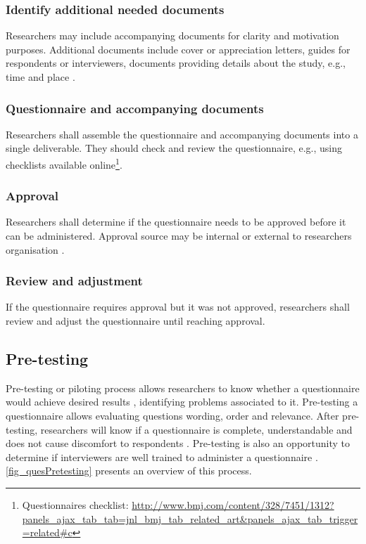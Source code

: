 \subsubsection{Identify additional needed documents}
Researchers may include accompanying documents for clarity and motivation purposes. Additional documents include cover or appreciation letters, guides for respondents or interviewers, documents providing details about the study, e.g., time and place \cite{Diem,Crawford1997,Boynton2004b}.

\subsubsection{Questionnaire and accompanying documents}
Researchers shall assemble the questionnaire and accompanying documents into a single deliverable. They should check and review the questionnaire, e.g., using checklists available online\footnote{Questionnaires checklist: \url{http://www.bmj.com/content/328/7451/1312?panels_ajax_tab_tab=jnl_bmj_tab_related_art&panels_ajax_tab_trigger=related\#c}}.

\subsubsection{Approval}
Researchers shall determine if the questionnaire needs to be approved before it can be administered. Approval source may be internal or external to researchers organisation \cite{Diem}.

\subsubsection{Review and adjustment}
If the questionnaire requires approval but it was not approved, researchers shall review and adjust the questionnaire until reaching approval.

\subsection{Pre-testing}
\label{sec:ques_pretesting}
Pre-testing or piloting process allows researchers to know whether a questionnaire would achieve desired results \cite{Crawford1997}, identifying problems associated to it. Pre-testing a questionnaire allows evaluating questions wording, order and relevance. After pre-testing, researchers will know if a questionnaire is complete, understandable and does not cause discomfort to respondents \cite{Boynton2004}. Pre-testing is also an opportunity to determine if interviewers are well trained to administer a questionnaire \cite{Crawford1997}. \autoref{fig_quesPretesting} presents an overview of this process.

